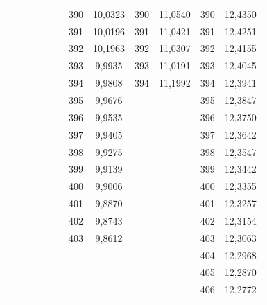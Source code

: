 \documentclass[a4paper,12pt]{article} %
\begin{document}
\begin{longtable}[c]{cccccccccc|c|c|}
	&  &  &  &  & \multicolumn{1}{c|}{} & \multicolumn{1}{c|}{390} & \multicolumn{1}{c|}{10,0323} & \multicolumn{1}{c|}{390} & 11,0540 & 390 & 12,4350 \\ \cline{7-12} 
	&  &  &  &  & \multicolumn{1}{c|}{} & \multicolumn{1}{c|}{391} & \multicolumn{1}{c|}{10,0196} & \multicolumn{1}{c|}{391} & 11,0421 & 391 & 12,4251 \\ \cline{7-12} 
	&  &  &  &  & \multicolumn{1}{c|}{} & \multicolumn{1}{c|}{392} & \multicolumn{1}{c|}{10,1963} & \multicolumn{1}{c|}{392} & 11,0307 & 392 & 12,4155 \\ \cline{7-12} 
	&  &  &  &  & \multicolumn{1}{c|}{} & \multicolumn{1}{c|}{393} & \multicolumn{1}{c|}{9,9935} & \multicolumn{1}{c|}{393} & 11,0191 & 393 & 12,4045 \\ \cline{7-12} 
	&  &  &  &  & \multicolumn{1}{c|}{} & \multicolumn{1}{c|}{394} & \multicolumn{1}{c|}{9,9808} & \multicolumn{1}{c|}{394} & 11,1992 & 394 & 12,3941 \\ \cline{7-12} 
	&  &  &  &  & \multicolumn{1}{c|}{} & \multicolumn{1}{c|}{395} & \multicolumn{1}{c|}{9,9676} &  &  & 395 & 12,3847 \\ \cline{7-8} \cline{11-12} 
	&  &  &  &  & \multicolumn{1}{c|}{} & \multicolumn{1}{c|}{396} & \multicolumn{1}{c|}{9,9535} &  &  & 396 & 12,3750 \\ \cline{7-8} \cline{11-12} 
	&  &  &  &  & \multicolumn{1}{c|}{} & \multicolumn{1}{c|}{397} & \multicolumn{1}{c|}{9,9405} &  &  & 397 & 12,3642 \\ \cline{7-8} \cline{11-12} 
	&  &  &  &  & \multicolumn{1}{c|}{} & \multicolumn{1}{c|}{398} & \multicolumn{1}{c|}{9,9275} &  &  & 398 & 12,3547 \\ \cline{7-8} \cline{11-12} 
	&  &  &  &  & \multicolumn{1}{c|}{} & \multicolumn{1}{c|}{399} & \multicolumn{1}{c|}{9,9139} &  &  & 399 & 12,3442 \\ \cline{7-8} \cline{11-12} 
	&  &  &  &  & \multicolumn{1}{c|}{} & \multicolumn{1}{c|}{400} & \multicolumn{1}{c|}{9,9006} &  &  & 400 & 12,3355 \\ \cline{7-8} \cline{11-12} 
	&  &  &  &  & \multicolumn{1}{c|}{} & \multicolumn{1}{c|}{401} & \multicolumn{1}{c|}{9,8870} &  &  & 401 & 12,3257 \\ \cline{7-8} \cline{11-12} 
	&  &  &  &  & \multicolumn{1}{c|}{} & \multicolumn{1}{c|}{402} & \multicolumn{1}{c|}{9,8743} &  &  & 402 & 12,3154 \\ \cline{7-8} \cline{11-12} 
	&  &  &  &  & \multicolumn{1}{c|}{} & \multicolumn{1}{c|}{403} & \multicolumn{1}{c|}{9,8612} &  &  & 403 & 12,3063 \\ \cline{7-8} \cline{11-12} 
	&  &  &  &  &  &  &  &  &  & 404 & 12,2968 \\ \cline{11-12} 
	&  &  &  &  &  &  &  &  &  & 405 & 12,2870 \\ \cline{11-12} 
	&  &  &  &  &  &  &  &  &  & 406 & 12,2772 \\ \cline{11-12} 

\end{longtable}
\end{document}
